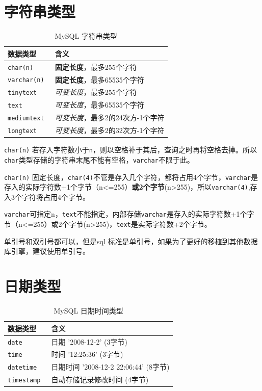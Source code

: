 \documentclass[UTF8,a4paper,12pt]{ctexbook}
\begin{document}
	\section{字符串类型}
		\begin{table}[H]
			\centering
			\caption{MySQL 字符串类型}
			\begin{tabular}{p{5cm}<{\centering}|p{11cm}<{\centering}}
				\toprule
					数据类型  &  含义\\
				\midrule
					\verb|char(n) | & \textbf{固定长度}，最多255个字符 \\
					\verb|varchar(n) | & \textbf{固定长度}，最多65535个字符 \\
					\verb|tinytext | & \textit{可变长度}，最多255个字符\\
					\verb|text | & \textit{可变长度}，最多65535个字符\\
					\verb|mediumtext | & \textit{可变长度}，最多2的24次方-1个字符\\
					\verb|longtext | & \textit{可变长度}，最多2的32次方-1个字符\\
				\bottomrule
			\end{tabular}
		\end{table}	
		
		\verb|char(n)| 若存入字符数小于\verb|n|，则以空格补于其后，查询之时再将空格去掉。所以\verb|char|类型存储的字符串末尾不能有空格，\verb|varchar|不限于此。
		
		\verb|char(n)| 固定长度，\verb|char(4)|不管是存入几个字符，都将占用4个字节，\verb|varchar|是存入的实际字符数+1个字节（n<=255）\textbf{或2个字节}(n>255)，所以\verb|varchar(4)|,存入3个字符将占用4个字节。
		
		\verb|varchar|可指定n，\verb|text|不能指定，内部存储\verb|varchar|是存入的实际字符数+1个字节（n<=255）或2个字节(n>255)，\verb|text|是实际字符数+2个字节。
		
		
		单引号和双引号都可以，但是sql 标准是单引号，如果为了更好的移植到其他数据库引擎，建议使用单引号。
		
	\section{日期类型}
		\begin{table}[H]
			\centering
			\caption{MySQL 日期时间类型}
			\begin{tabular}{p{5cm}<{\centering}|p{11cm}<{\centering}}
				\toprule
					数据类型  &  含义\\
				\midrule
					\verb|date | &  日期 '2008-12-2' (3字节)\\
					\verb|time | &  时间 '12:25:36' (3字节)\\
					\verb|datetime | & 日期时间 '2008-12-2 22:06:44' (8字节)\\
					\verb|timestamp | & 自动存储记录修改时间 (4字节)\\
				\bottomrule
			\end{tabular}
		\end{table}	
		
\end{document}
